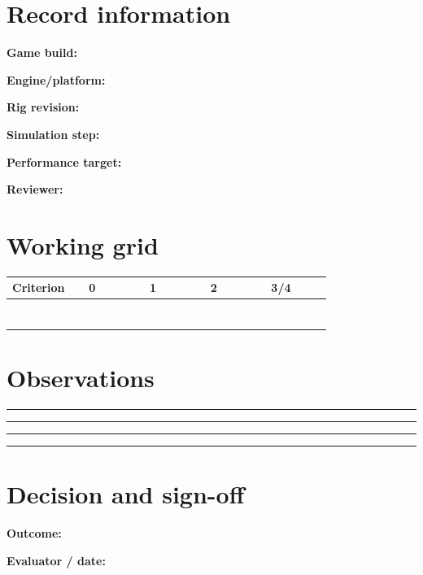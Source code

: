\documentclass[10pt,letterpaper]{article}
\begin{document}
\makedoctitle
\makedocsummary

\section{Record information}
\noindent\textbf{Game build:}\quad\hrulefill\par\vspace{10pt}
\noindent\textbf{Engine/platform:}\quad\hrulefill\par\vspace{10pt}
\noindent\textbf{Rig revision:}\quad\hrulefill\par\vspace{10pt}
\noindent\textbf{Simulation step:}\quad\hrulefill\par\vspace{10pt}
\noindent\textbf{Performance target:}\quad\hrulefill\par\vspace{10pt}
\noindent\textbf{Reviewer:}\quad\hrulefill\par\vspace{10pt}\section{Working grid}
\begin{longtable}{|p{0.156\linewidth}|p{0.156\linewidth}|p{0.156\linewidth}|p{0.156\linewidth}|p{0.156\linewidth}|}
\hline
\textbf{Criterion} & \textbf{0} & \textbf{1} & \textbf{2} & \textbf{3/4}\\\hline
\endhead
\rule{0pt}{20pt} &  &  &  & \\\hline
\rule{0pt}{20pt} &  &  &  & \\\hline
\rule{0pt}{20pt} &  &  &  & \\\hline
\rule{0pt}{20pt} &  &  &  & \\\hline
\rule{0pt}{20pt} &  &  &  & \\\hline
\rule{0pt}{20pt} &  &  &  & \\\hline
\rule{0pt}{20pt} &  &  &  & \\\hline
\end{longtable}
\section{Observations}
\noindent\rule{\linewidth}{0.4pt}\par\vspace{18pt}\noindent\rule{\linewidth}{0.4pt}\par\vspace{18pt}\noindent\rule{\linewidth}{0.4pt}\par\vspace{18pt}\noindent\rule{\linewidth}{0.4pt}\par\vspace{18pt}\section{Decision and sign-off}
\noindent\textbf{Outcome:}\quad\hrulefill\par\vspace{16pt}\noindent\textbf{Evaluator / date:}\quad\hrulefill\par
\end{document}
